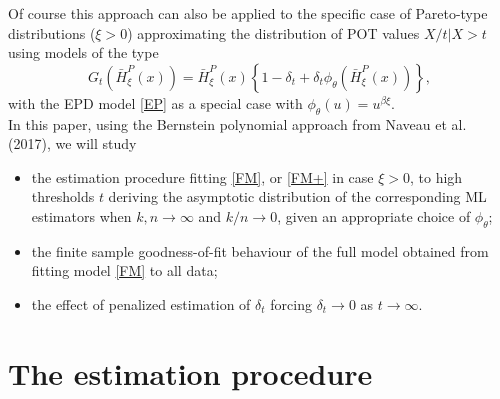 \documentclass[a4paper,11pt]{article}
\begin{document}
 Of course this approach can also be applied to the specific case of Pareto-type distributions ($\xi >0$) approximating the distribution of POT values $X/t|X>t$ using models of the type
 \begin{equation}
G_t \left(\bar{H}^P_{\xi}(x)\right)
=
\bar{H}^P_\xi (x)\left\{1-\delta_t +\delta_t \phi_{\theta}\left( \bar{H}^P_\xi ( x) \right) \right\},
\label{FM+}
\end{equation} 
with the EPD model \eqref{EP}  as a special case with $\phi_{\theta}(u)=u^{\beta\xi}$.\\
 
 In this paper, using the Bernstein polynomial approach from Naveau et al. (2017), we will study
 \begin{itemize}
 \item the estimation procedure fitting \eqref{FM}, or \eqref{FM+} in case $\xi >0$, to high thresholds $t$ deriving the asymptotic distribution of the corresponding ML estimators when $k,n \to \infty$ and $k/n \to 0$, given an appropriate choice of $ \phi_\theta$;
  \item the finite sample goodness-of-fit behaviour of the full model obtained from fitting model \eqref{FM} to all data;
  \item the effect of penalized estimation of $\delta_t$ forcing $\delta_t \to 0$ as $t \to \infty$. 
 \end{itemize}
 
 \section{The estimation procedure}
 
\end{document}
